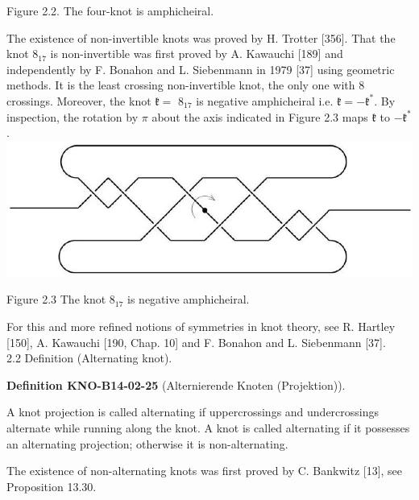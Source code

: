 \documentclass[10pt, letterpaper]{article}
\newcommand{\CustomHeading}[3]{%
  \par\medskip\noindent%
  \textbf{#1 #2} \textnormal{(#3)}.\enskip%
}
\newenvironment{DEF}[2]{\begin{unitbox}\CustomHeading{Definition}{#1}{#2}}{\end{unitbox}}
\begin{document}
Figure 2.2. The four-knot is amphicheiral.

The existence of non-invertible knots was proved by H. Trotter [356]. That the knot $8_{17}$ is non-invertible was first proved by A. Kawauchi [189] and independently by F. Bonahon and L. Siebenmann in 1979 [37] using geometric methods. It is the least crossing non-invertible knot, the only one with 8 crossings. Moreover, the knot $\mathfrak{k}=$ $8_{17}$ is negative amphicheiral i.e. $\mathfrak{k}=-\mathfrak{k}^{*}$. By inspection, the rotation by $\pi$ about the axis indicated in Figure 2.3 maps $\mathfrak{k}$ to $-\mathfrak{k}^{*}$.\\
\includegraphics[scale=0.2, center]{2025_05_21_9c06be8de7a55410f8c1g-031}

Figure 2.3 The knot $8_{17}$ is negative amphicheiral.

For this and more refined notions of symmetries in knot theory, see R. Hartley [150], A. Kawauchi [190, Chap. 10] and F. Bonahon and L. Siebenmann [37].\\


2.2 Definition (Alternating knot). 

\begin{DEF}{KNO-B14-02-25}{Alternierende Knoten (Projektion)}
A knot projection is called alternating if uppercrossings and undercrossings alternate while running along the knot. A knot is called alternating if it possesses an alternating projection; otherwise it is non-alternating.
\end{DEF}

The existence of non-alternating knots was first proved by C. Bankwitz [13], see Proposition 13.30.
\end{document}
